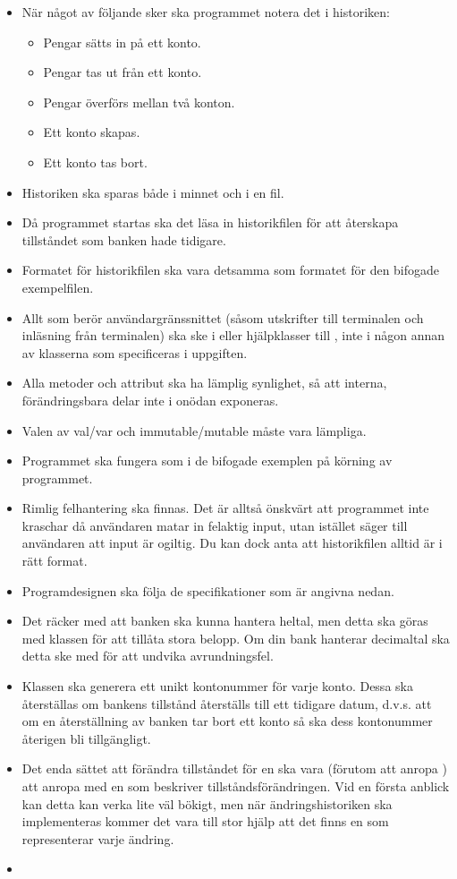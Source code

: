 \begin{itemize}
\item När något av följande sker ska programmet notera det i historiken:
\begin{itemize}
\item Pengar sätts in på ett konto.
\item Pengar tas ut från ett konto.
\item Pengar överförs mellan två konton.
\item Ett konto skapas.
\item Ett konto tas bort.
\end{itemize}
\item Historiken ska sparas både i minnet och i en fil.
\item Då programmet startas ska det läsa in historikfilen för att återskapa tillståndet som banken hade tidigare.
\item Formatet för historikfilen ska vara detsamma som formatet för den bifogade exempelfilen.
\item Allt som berör användargränssnittet (såsom utskrifter till terminalen och inläsning från terminalen) ska ske i  eller hjälpklasser till , inte i någon annan av klasserna som specificeras i uppgiften.
\item Alla metoder och attribut ska ha lämplig synlighet, så att interna, förändringsbara delar inte i onödan exponeras.
\item Valen av val/var och immutable/mutable måste vara lämpliga.
\item Programmet ska fungera som i de bifogade exemplen på körning av programmet.
\item Rimlig felhantering ska finnas. Det är alltså önskvärt att programmet inte kraschar då användaren matar in felaktig input, utan istället säger till användaren att input är ogiltig. Du kan dock anta att historikfilen alltid är i rätt format.
\item Programdesignen ska följa de specifikationer som är angivna nedan.
\item Det räcker med att banken ska kunna hantera heltal, men detta ska göras med klassen  för att tillåta stora belopp. Om din bank hanterar decimaltal ska detta ske med  för att undvika avrundningsfel.
\item Klassen  ska generera ett unikt kontonummer för varje konto. Dessa ska återställas om bankens tillstånd återställs till ett tidigare datum, d.v.s. att om en återställning av banken tar bort ett konto så ska dess kontonummer återigen bli tillgängligt.
\item Det enda sättet att förändra tillståndet för en  ska vara (förutom att anropa ) att anropa  med en  som beskriver tillståndsförändringen. Vid en första anblick kan detta kan verka lite väl bökigt, men när ändringshistoriken ska implementeras kommer det vara till stor hjälp att det finns en  som representerar varje ändring.
\item 
\end{itemize}

